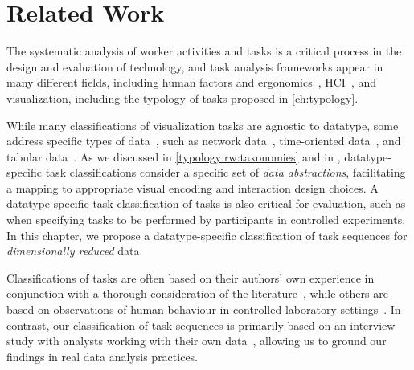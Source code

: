 \section{Related Work}
\label{drvistasks:rw}


The systematic analysis of worker activities and tasks is a critical process in the design and evaluation of technology, and task analysis frameworks appear in many different fields, including human factors and ergonomics~\cite{Vicente1999}, \ac{HCI}~\cite{Mullins1993}, and visualization, including the typology of tasks proposed in \autoref{ch:typology}.

While many classifications of visualization tasks are agnostic to datatype, some address specific types of data~\cite{Shneiderman1996}, such as network data~\cite{Lee2006}, time-oriented data~\cite{Lammarsch2012}, and tabular data~\cite{Henry2006}.
As we discussed in \autoref{typology:rw:taxonomies} and in \citet{Meyer2015}, datatype-specific task classifications consider a specific set of {\it data abstractions}, facilitating a mapping to appropriate visual encoding and interaction design choices.
A datatype-specific task classification of tasks is also critical for evaluation, such as when specifying tasks to be performed by participants in controlled experiments.
In this chapter, we propose a datatype-specific classification of task sequences for {\it dimensionally reduced} data. 

Classifications of tasks are often based on their authors' own experience in conjunction with a thorough consideration of the literature~\cite{Amar2004,Shneiderman1996}, while others are based on observations of human behaviour in controlled laboratory settings~\cite{Amar2005}. 
In contrast, our classification of task sequences is primarily based on an interview study with analysts working with their own data~\cite{McGrath1995}, allowing us to ground our findings in real data analysis practices.

